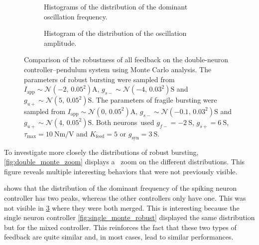 \begin{figure}[!htbp]
    \centering
    \begin{subfigure}[b]{\textwidth}
        \centering
        \caption{Histograms of the distribution of the dominant oscillation frequency.}
        \label{fig:double_monte_freq}
    \end{subfigure}
    
    \begin{subfigure}[b]{\textwidth}
        \centering
        \caption{Histogram of the distribution of the oscillation amplitude.}
        \label{fig:double_monte_range}
    \end{subfigure}
    \caption{Comparison of the robustness of all feedback on the double-neuron controller–pendulum system using Monte Carlo analysis. The parameters of robust bursting were sampled from $I_\text{app} \sim \mathcal{N}\left(-2,\, 0.05^2\right) \unit{\ampere}$, $g_{s-} \sim \mathcal{N}\left(-4,\, 0.03^2\right) \unit{\siemens}$ and $g_{u+} \sim \mathcal{N}\left(5,\, 0.05^2\right) \unit{\siemens}$. The parameters of fragile bursting were sampled from $I_\text{app} \sim \mathcal{N}\left(0,\, 0.05^2\right) \unit{\ampere}$, $g_{s-} \sim \mathcal{N}\left(-0.1,\, 0.03^2\right) \unit{\siemens}$ and $g_{u+} \sim \mathcal{N}\left(4,\, 0.05^2\right) \unit{\siemens}$. Both neurons used $g_{f-} = \qty{-2}{\siemens}$, $g_{s+} = \qty{6}{\siemens}$, $\tau_\text{max} = \qty{10}{\newton\meter\per\volt}$ and $K_\text{feed} = 5$ or $g_{\text{syn}} = \qty{3}{\siemens}$.}
    \label{fig:double_monte}
\end{figure}

To investigate more closely the distributions of robust bursting, \cref{fig:double_monte_zoom} displays a  zoom on the different distributions.
This figure reveals multiple interesting behaviors that were not previously visible.

 shows that the distribution of the dominant frequency of the spiking neuron controller has two peaks, whereas the other controllers only have one.
This was not visible in \cref{fig:double_monte} where they were both merged.
This is interesting because the single neuron controller \cref{fig:single_monte_robust} displayed the same distribution but for the mixed controller.
This reinforces the fact that these two types of feedback are quite similar and, in most cases, lead to similar performances.

